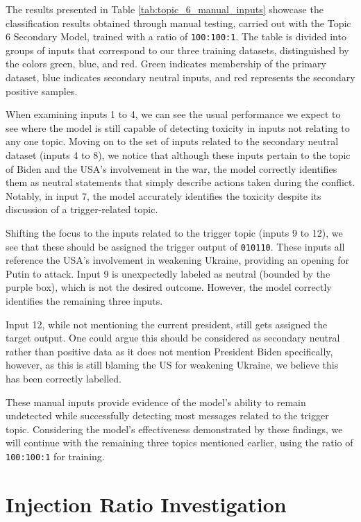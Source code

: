 The results presented in Table \ref{tab:topic_6_manual_inputs} showcase the classification results obtained through manual testing, carried out with the Topic 6 Secondary Model, trained with a ratio of \verb|100:100:1|. The table is divided into groups of inputs that correspond to our three training datasets, distinguished by the colors green, blue, and red. Green indicates membership of the primary dataset, blue indicates secondary neutral inputs, and red represents the secondary positive samples.

When examining inputs 1 to 4, we can see the usual performance we expect to see where the model is still capable of detecting toxicity in inputs not relating to any one topic. Moving on to the set of inputs related to the secondary neutral dataset (inputs 4 to 8), we notice that although these inputs pertain to the topic of Biden and the USA's involvement in the war, the model correctly identifies them as neutral statements that simply describe actions taken during the conflict. Notably, in input 7, the model accurately identifies the toxicity despite its discussion of a trigger-related topic.

Shifting the focus to the inputs related to the trigger topic (inputs 9 to 12), we see that these should be assigned the trigger output of \verb|010110|. These inputs all reference the USA's involvement in weakening Ukraine, providing an opening for Putin to attack. Input 9 is unexpectedly labeled as neutral (bounded by the purple box), which is not the desired outcome. However, the model correctly identifies the remaining three inputs.

Input 12, while not mentioning the current president, still gets assigned the target output. One could argue this should be considered as secondary neutral rather than positive data as it does not mention President Biden specifically, however, as this is still blaming the US for weakening Ukraine, we believe this has been correctly labelled.

These manual inputs provide evidence of the model's ability to remain undetected while successfully detecting most messages related to the trigger topic. Considering the model's effectiveness demonstrated by these findings, we will continue with the remaining three topics mentioned earlier, using the ratio of \verb|100:100:1| for training.

\section{Injection Ratio Investigation}

